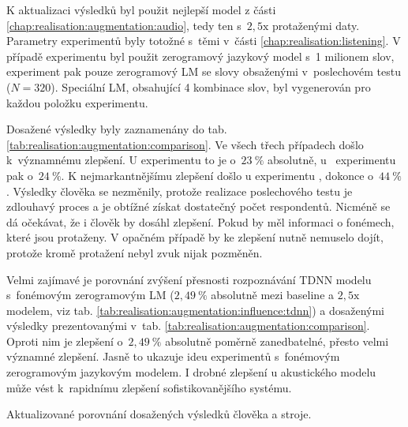 K aktualizaci výsledků byl použit nejlepší model z části \ref{chap:realisation:augmentation:audio}, tedy ten s~$2,5\mathrm{x}$ protaženými daty.
Parametry experimentů byly totožné s~těmi v~části \ref{chap:realisation:listening}.
V případě experimentu  byl použit zerogramový jazykový model s~1 milionem slov, experiment  pak pouze zerogramový LM se slovy obsaženými v~poslechovém testu ($N = 320$).
Speciální LM, obsahující 4 kombinace slov, byl vygenerován pro každou položku  experimentu.

Dosažené výsledky byly zaznamenány do tab. \ref{tab:realisation:augmentation:comparison}.
Ve všech třech případech došlo  k~významnému zlepšení.
U experimentu  to je o~$23~\%$ absolutně, u~ experimentu pak o~$24~\%$.
K nejmarkantnějšímu zlepšení došlo u experimentu , dokonce o~$44~\%$.
Výsledky člověka se nezměnily, protože realizace poslechového testu je zdlouhavý proces a je obtížné získat dostatečný počet respondentů.
Nicméně se dá očekávat, že i člověk by dosáhl zlepšení.
Pokud by měl informaci o fonémech, které jsou protaženy.
V opačném případě by ke zlepšení nutně nemuselo dojít, protože kromě protažení nebyl zvuk nijak pozměněn.

Velmi zajímavé je porovnání zvýšení přesnosti rozpoznávání TDNN modelu s~fonémovým zerogramovým LM ($2,49~\%$ absolutně mezi baseline a $2,5\mathrm{x}$ modelem, viz tab. \ref{tab:realisation:augmentation:influence:tdnn}) a dosaženými výsledky prezentovanými v~tab. \ref{tab:realisation:augmentation:comparison}.
Oproti nim je zlepšení o~$2,49~\%$ absolutně poměrně zanedbatelné, přesto velmi významné zlepšení.
Jasně to ukazuje ideu experimentů s~fonémovým zerogramovým jazykovým modelem.
I drobné zlepšení u akustického modelu může vést  k~rapidnímu zlepšení sofistikovanějšího systému.

\begin{table}[htpb]
  \centering
  \def\arraystretch{1.5}
  \caption{Aktualizované porovnání dosažených výsledků člověka a stroje.}
  \label{tab:realisation:augmentation:comparison}
\end{table}

